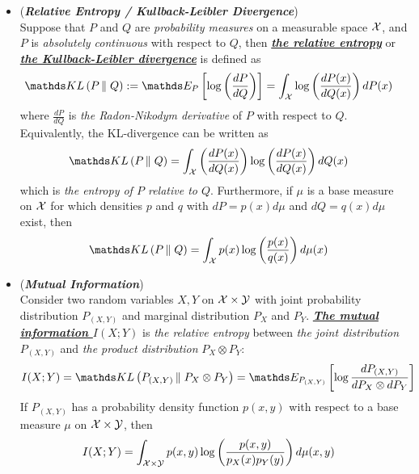 \documentclass[11pt]{article}
\begin{document}
\begin{itemize}
\item \begin{definition} (\textbf{\emph{Relative Entropy / Kullback-Leibler Divergence}}) \citep{thomas2006elements}\\
Suppose that $P$ and $Q$ are \emph{probability measures} on a measurable space ${\mathcal X}$, and $P$ is \emph{absolutely continuous} with respect to $Q$, then \underline{\emph{\textbf{the relative entropy}}} or \underline{\emph{\textbf{the Kullback-Leibler divergence}}} is defined as
\begin{align*}
\kl{P}{Q} &:=\E{P}{\log\paren{\frac{dP}{dQ}}} = \int_{\cX} \log\paren{\frac{dP(x)}{dQ(x)}} dP(x)
\end{align*} where $\frac{dP}{dQ}$ is \emph{the Radon-Nikodym derivative} of $P$ with respect to $Q$. Equivalently, the KL-divergence can be written as
\begin{align*}
\kl{P}{Q} &= \int_{\cX} \paren{\frac{dP(x)}{dQ(x)}} \log\paren{\frac{dP(x)}{dQ(x)}} dQ(x) 
\end{align*} which is \emph{the entropy of $P$ relative to $Q$}. Furthermore, if $\mu$ is a base measure on ${\mathcal X}$ for which densities $p$ and $q$ with $dP = p(x)d\mu$ and $dQ = q(x) d\mu$ exist, then 
\begin{align*}
\kl{P}{Q} &= \int_{\cX} p(x)\log\paren{\frac{p(x)}{q(x)}} d\mu(x)
\end{align*}
\end{definition}

\item \begin{definition}(\textbf{\emph{Mutual Information}}) \citep{thomas2006elements}\\
Consider two random variables $X, Y$ on ${\mathcal X} \times {\mathcal Y}$ with joint probability distribution $P_{(X, Y)}$ and marginal distribution $P_{X}$ and $P_{Y}$. \underline{\emph{\textbf{The mutual information $I(X; Y)$}}} is \emph{the relative entropy} between \emph{the joint distribution} $P_{(X, Y)}$ and \emph{the product distribution} $P_{X}\otimes P_{Y}$:
\begin{align*}
I(X; Y) &= \kl{P_{(X, Y)}}{P_{X}\otimes P_{Y}} = \E{P_{(X, Y)}}{\log \frac{dP_{(X,Y)}}{dP_{X} \otimes dP_{Y}}}
\end{align*} If $P_{(X, Y)}$ has a probability density function $p(x,y)$ with respect to a base measure $\mu$ on ${\mathcal X} \times {\mathcal Y}$, then 
\begin{align*}
I(X; Y) &=\int_{{\mathcal X} \times {\mathcal Y}} p(x, y)\log\left(\frac{p(x, y)}{p_{X}(x)p_{Y}(y)}\right) d\mu(x, y)
\end{align*}
\end{definition}


\end{itemize}
\end{document}
